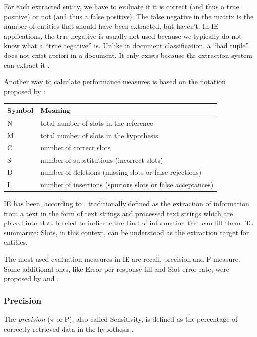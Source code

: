 For each extracted entity, we have to evaluate if it is correct (and thus a true positive) or not (and thus a false positive). The false negative in the matrix is the number of entities that should have been extracted, but haven't. In IE applications, the true negative is usually not used \cite{Sitter:2004} because we typically do not know what a \enquote{true negative} is. Unlike in document classification, a \enquote{bad tuple} does not exist apriori in a document. It only exists because the extraction system can extract it \cite{Ipeirotis:2007}.

Another way to calculate performance measures is based on the notation proposed by \citeauthor{Makhoul:1999} \cite{Makhoul:1999}:

\begin{table}[H]
\centering
\begin{tabular*}{\textwidth}{ll}
	\toprule
	\textbf{Symbol} & \textbf{Meaning} \\
	\midrule
	N & total number of slots in the reference \\
	M & total number of slots in the hypothesis \\
	C & number of correct slots \\
	S & number of substitutions (incorrect slots) \\
	D & number of deletions (missing slots or false rejections) \\
	I & number of insertions (spurious slots or false acceptances) \\
	\bottomrule
\end{tabular*}
\end{table}

\gls{IE} has been, according to \cite{Chinchor:1998}, traditionally defined as the extraction of information from a text in the form of text strings and processed text strings which are placed into slots labeled to indicate the kind of information that can fill them. To summarize: Slots, in this context, can be understood as the extraction target for entities.

The most used evaluation measures in \gls{IE} are recall, precision and F-measure. Some additional ones, like Error per response fill and  Slot error rate, were proposed by \cite{Chinchor:1995} and \cite{Makhoul:1999}.

\subsubsection{Precision}
The \textit{precision} (\ensuremath{\pi} or P), also called Sensitivity, is defined as the percentage of correctly retrieved data in the hypothesis \cite{Carstensen:2010}. 

